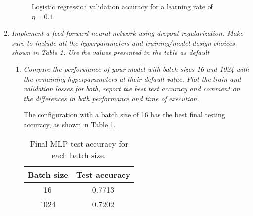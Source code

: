 \documentclass[12pt]{article}
\begin{document}
\begin{enumerate}[leftmargin=\labelsep]
          \begin{figure}[H]
              \centering
              
              \caption{Logistic regression validation accuracy for a learning rate of $\eta = 0.1$.}
              \label{fig:q2-logistic_regression-validation-accuracy-batch-16-lr-0.1-epochs-20-l2-0.0-opt-sgd}
          \end{figure}

          \vspace{12pt}

    \item \textit{Implement a feed-forward neural network using dropout regularization. Make
              sure to include all the hyperparameters and training/model design choices shown in Table
              1. Use the values presented in the table as default}

          \begin{enumerate}[label=\alph*)]
              \item \textit{Compare the performance of your model with batch sizes 16 and 1024 with
                        the remaining hyperparameters at their default value. Plot the train and validation
                        losses for both, report the best test accuracy and comment on the differences in both
                        performance and time of execution.}

                    \vspace{12pt}

                    The configuration with a batch size of 16 has the best final testing accuracy, as shown in Table \ref{tab:mlp-batch-size-accuracy}.

                    \vspace{12pt}

                    \begin{table}[H]
                        \centering
                        \begin{tabular}{|c|c|}
                            \hline
                            Batch size & Test accuracy \\ \hline
                            16         & 0.7713        \\ \hline
                            1024       & 0.7202        \\ \hline
                        \end{tabular}
                        \caption{Final MLP test accuracy for each batch size.}
                        \label{tab:mlp-batch-size-accuracy}
                    \end{table}


\end{enumerate}
\end{enumerate}
\end{document}
